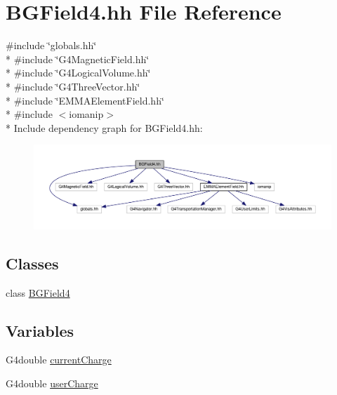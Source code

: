 \hypertarget{BGField4_8hh}{}\section{B\+G\+Field4.\+hh File Reference}
\label{BGField4_8hh}
{\ttfamily \#include \char`\"{}globals.\+hh\char`\"{}}\\*
{\ttfamily \#include \char`\"{}G4\+Magnetic\+Field.\+hh\char`\"{}}\\*
{\ttfamily \#include \char`\"{}G4\+Logical\+Volume.\+hh\char`\"{}}\\*
{\ttfamily \#include \char`\"{}G4\+Three\+Vector.\+hh\char`\"{}}\\*
{\ttfamily \#include \char`\"{}E\+M\+M\+A\+Element\+Field.\+hh\char`\"{}}\\*
{\ttfamily \#include $<$iomanip$>$}\\*
Include dependency graph for B\+G\+Field4.\+hh\+:
\nopagebreak
\begin{figure}[H]
\begin{center}
\leavevmode
\includegraphics[width=350pt]{BGField4_8hh__incl}
\end{center}
\end{figure}
\subsection*{Classes}
\begin{DoxyCompactItemize}
\item 
class \hyperlink{classBGField4}{B\+G\+Field4}
\end{DoxyCompactItemize}
\subsection*{Variables}
\begin{DoxyCompactItemize}
\item 
G4double \hyperlink{BGField4_8hh_acb265d8eecfa1acd31056f0c7915362e}{current\+Charge}
\item 
G4double \hyperlink{BGField4_8hh_a2d61cdd1b1b5ed409f7c91b54737c1b9}{user\+Charge}
\end{DoxyCompactItemize}


